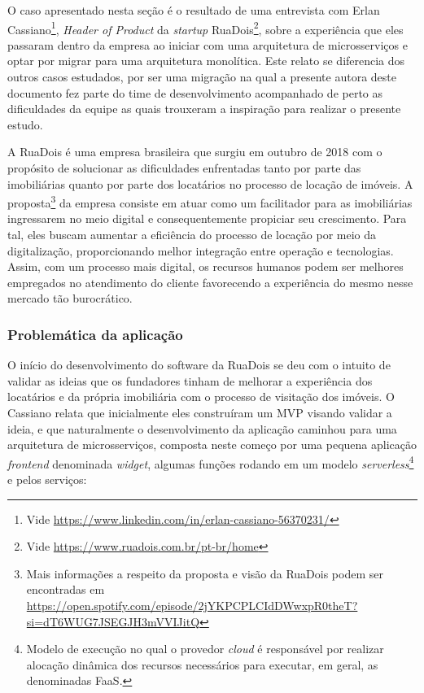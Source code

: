 O caso apresentado nesta seção é o resultado de uma entrevista com Erlan Cassiano\footnote{Vide
\url{https://www.linkedin.com/in/erlan-cassiano-56370231/}}, \textit{Header of Product} da
\textit{startup} RuaDois\footnote{Vide \url{https://www.ruadois.com.br/pt-br/home}}, sobre a
experiência que eles passaram dentro da empresa ao iniciar com uma arquitetura de microsserviços
e optar por migrar para uma arquitetura monolítica. Este relato se diferencia dos outros casos
estudados, por ser uma migração na qual a presente autora deste documento fez parte do time de
desenvolvimento acompanhado de perto as dificuldades da equipe as quais trouxeram a inspiração para
realizar o presente estudo.

A RuaDois é uma empresa brasileira que surgiu em outubro de 2018 com o propósito de
solucionar as dificuldades enfrentadas tanto por parte das imobiliárias quanto por parte dos
locatários no processo de locação de imóveis. A proposta\footnote{Mais informações a respeito
da proposta e visão da RuaDois podem ser encontradas em
\url{https://open.spotify.com/episode/2jYKPCPLCIdDWwxpR0theT?si=dT6WUG7JSEGJH3mVVIJitQ}}
da empresa consiste em atuar como um facilitador para as imobiliárias
ingressarem no meio digital e consequentemente propiciar seu crescimento. Para tal,
eles buscam aumentar a eficiência do processo de locação por meio da digitalização,
proporcionando melhor integração entre operação e tecnologias. Assim, com um processo
mais digital, os recursos humanos podem ser melhores empregados no atendimento do
cliente favorecendo a experiência do mesmo nesse mercado tão burocrático.

\subsubsection{Problemática da aplicação}

O início do desenvolvimento do software da RuaDois se deu com o intuito de validar as ideias que
os fundadores tinham de melhorar a experiência dos locatários e da própria imobiliária com o processo
de visitação dos imóveis. O Cassiano relata que inicialmente eles construíram um \gls{MVP} visando
validar a ideia, e que naturalmente o desenvolvimento da aplicação caminhou para uma arquitetura de
microsserviços, composta neste começo por uma pequena aplicação \textit{frontend} denominada
\textit{widget}, algumas funções rodando em um modelo \textit{serverless}\footnote{Modelo de
execução no qual o provedor \textit{cloud} é responsável por realizar alocação dinâmica dos recursos
necessários para executar, em geral, as denominadas \gls{FaaS}.} e pelos serviços:

